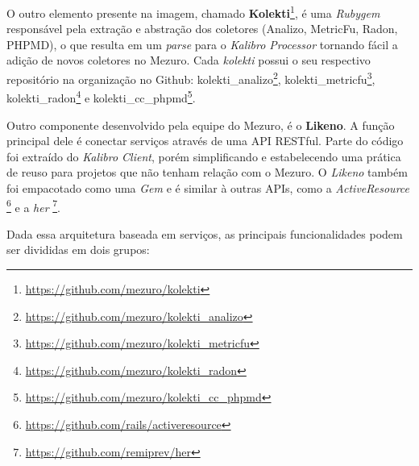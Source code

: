 O outro elemento presente na imagem, chamado \textbf{Kolekti}\footnote{\url{https://github.com/mezuro/kolekti}},
é uma \textit{Rubygem} responsável pela extração e abstração dos coletores
(Analizo, MetricFu, Radon, PHPMD), o que resulta em um \textit{parse} para o
\textit{Kalibro Processor} tornando fácil a adição de novos coletores no Mezuro.
Cada \textit{kolekti} possui o seu respectivo repositório na organização no
Github: kolekti\_analizo\footnote{\url{https://github.com/mezuro/kolekti\_analizo}},
kolekti\_metricfu\footnote{\url{https://github.com/mezuro/kolekti\_metricfu}},
kolekti\_radon\footnote{\url{https://github.com/mezuro/kolekti\_radon}} e
kolekti\_cc\_phpmd\footnote{\url{https://github.com/mezuro/kolekti\_cc\_phpmd}}.

Outro componente desenvolvido pela equipe do Mezuro, é o \textbf{Likeno}. A
função principal dele é conectar serviços através de uma API RESTful. Parte do
código foi extraído do \textit{Kalibro Client}, porém simplificando e
estabelecendo uma prática de reuso para projetos que não tenham relação com o
Mezuro. O \textit{Likeno} também foi empacotado como uma \textit{Gem} e é
similar à outras APIs, como a \textit{ActiveResource}
\footnote{\url{https://github.com/rails/activeresource}} e a \textit{her}
\footnote{\url{https://github.com/remiprev/her}}.

Dada essa arquitetura baseada em serviços, as principais funcionalidades podem
ser divididas em dois grupos:

